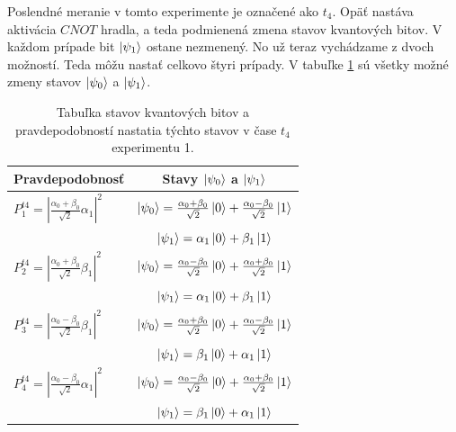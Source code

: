 Poslendné meranie v tomto experimente je označené ako \(t_4\). Opäť nastáva
aktivácia \(CNOT\) hradla, a teda podmienená zmena stavov kvantových bitov.
V každom prípade bit \(\ket{\psi_1}\) ostane nezmenený. No už teraz vychádzame 
z dvoch možností. Teda môžu nastať celkovo štyri prípady. V tabuľke 
\ref{expr1_t4_states} sú všetky možné zmeny stavov \(\ket{\psi_0}\) a
\(\ket{\psi_1}\).

\begin{table}
\centering
\begin{tabular}{|l|c|}
\hline
\textbf{Pravdepodobnosť} & \textbf{Stavy \(\ket{\psi_0}\) a \(\ket{\psi_1}\)} \\
\hline
\(P^{t4}_1 = |\frac{\alpha_0 + \beta_0}{\sqrt{2}}\alpha_1|^2\) & 
\(\ket{\psi_0} = \frac{\alpha_0 + \beta_0}{\sqrt{2}}\ket{0} + \frac{\alpha_0 - \beta_0}{\sqrt{2}}\ket{1}\) \\
& \(\ket{\psi_1} = \alpha_1\ket{0} + \beta_1\ket{1}\) \\
\hline

\(P^{t4}_2 = |\frac{\alpha_0 + \beta_0}{\sqrt{2}}\beta_1|^2\) & 
\(\ket{\psi_0} = \frac{\alpha_0 - \beta_0}{\sqrt{2}}\ket{0} + \frac{\alpha_0 + \beta_0}{\sqrt{2}}\ket{1}\) \\
& \(\ket{\psi_1} = \alpha_1\ket{0} + \beta_1\ket{1}\) \\
\hline

\(P^{t4}_3 = |\frac{\alpha_0 - \beta_0}{\sqrt{2}}\beta_1|^2\) & 
\(\ket{\psi_0} = \frac{\alpha_0 + \beta_0}{\sqrt{2}}\ket{0} + \frac{\alpha_0 - \beta_0}{\sqrt{2}}\ket{1}\) \\
& \(\ket{\psi_1} = \beta_1\ket{0} + \alpha_1\ket{1}\) \\
\hline

\(P^{t4}_4 = |\frac{\alpha_0 - \beta_0}{\sqrt{2}}\alpha_1|^2\) & 
\(\ket{\psi_0} = \frac{\alpha_0 - \beta_0}{\sqrt{2}}\ket{0} + \frac{\alpha_0 + \beta_0}{\sqrt{2}}\ket{1}\) \\
& \(\ket{\psi_1} = \beta_1\ket{0} + \alpha_1\ket{1}\) \\
\hline

\end{tabular}

\caption{\label{expr1_t4_states} Tabuľka stavov kvantových bitov a pravdepodobností
nastatia týchto stavov v čase \(t_4\) experimentu 1.}
\end{table}

